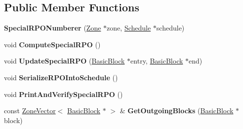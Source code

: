 \subsection*{Public Member Functions}
\begin{DoxyCompactItemize}
\item 
{\bfseries Special\+R\+P\+O\+Numberer} (\hyperlink{classv8_1_1internal_1_1_zone}{Zone} $\ast$zone, \hyperlink{classv8_1_1internal_1_1compiler_1_1_schedule}{Schedule} $\ast$schedule)\hypertarget{classv8_1_1internal_1_1compiler_1_1_special_r_p_o_numberer_ac9535b87ba2626cc8b93a87645315971}{}\label{classv8_1_1internal_1_1compiler_1_1_special_r_p_o_numberer_ac9535b87ba2626cc8b93a87645315971}

\item 
void {\bfseries Compute\+Special\+R\+PO} ()\hypertarget{classv8_1_1internal_1_1compiler_1_1_special_r_p_o_numberer_a345672f229561ea9aa11f7fc24547cfb}{}\label{classv8_1_1internal_1_1compiler_1_1_special_r_p_o_numberer_a345672f229561ea9aa11f7fc24547cfb}

\item 
void {\bfseries Update\+Special\+R\+PO} (\hyperlink{classv8_1_1internal_1_1compiler_1_1_basic_block}{Basic\+Block} $\ast$entry, \hyperlink{classv8_1_1internal_1_1compiler_1_1_basic_block}{Basic\+Block} $\ast$end)\hypertarget{classv8_1_1internal_1_1compiler_1_1_special_r_p_o_numberer_ab66f2a21671fd63bd0bd4a05e075be0f}{}\label{classv8_1_1internal_1_1compiler_1_1_special_r_p_o_numberer_ab66f2a21671fd63bd0bd4a05e075be0f}

\item 
void {\bfseries Serialize\+R\+P\+O\+Into\+Schedule} ()\hypertarget{classv8_1_1internal_1_1compiler_1_1_special_r_p_o_numberer_ab7814aee37c7bc4a48900ebaa98c1d40}{}\label{classv8_1_1internal_1_1compiler_1_1_special_r_p_o_numberer_ab7814aee37c7bc4a48900ebaa98c1d40}

\item 
void {\bfseries Print\+And\+Verify\+Special\+R\+PO} ()\hypertarget{classv8_1_1internal_1_1compiler_1_1_special_r_p_o_numberer_a9787689e0b490cb784024788ece3af89}{}\label{classv8_1_1internal_1_1compiler_1_1_special_r_p_o_numberer_a9787689e0b490cb784024788ece3af89}

\item 
const \hyperlink{classv8_1_1internal_1_1_zone_vector}{Zone\+Vector}$<$ \hyperlink{classv8_1_1internal_1_1compiler_1_1_basic_block}{Basic\+Block} $\ast$ $>$ \& {\bfseries Get\+Outgoing\+Blocks} (\hyperlink{classv8_1_1internal_1_1compiler_1_1_basic_block}{Basic\+Block} $\ast$block)\hypertarget{classv8_1_1internal_1_1compiler_1_1_special_r_p_o_numberer_adc2d8528abbcb5572f1a6ebcdb268f6f}{}\label{classv8_1_1internal_1_1compiler_1_1_special_r_p_o_numberer_adc2d8528abbcb5572f1a6ebcdb268f6f}

\end{DoxyCompactItemize}
